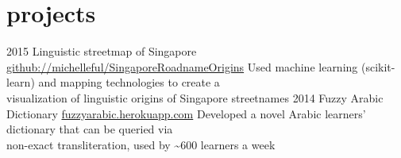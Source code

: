 \documentclass[]{friggeri-cv}
\begin{document}
\section{projects}

\begin{entrylist}
  \entry
    {2015}
    {Linguistic streetmap of Singapore}
    {\href{https://github.com/michelleful/SingaporeRoadnameOrigins}{github://michelleful/SingaporeRoadnameOrigins}}
    {\Squaredot Used machine learning (scikit-learn) and mapping technologies to create a \\
     \hspace*{3pt} visualization of linguistic origins of Singapore streetnames
    }
  \entry
    {2014}
    {Fuzzy Arabic Dictionary}
    {\href{http://fuzzyarabic.herokuapp.com}{fuzzyarabic.herokuapp.com}}
    {
    \Squaredot Developed a novel Arabic learners' dictionary that can be queried via \\
    \hspace*{3pt} non-exact transliteration, used by \textasciitilde 600 learners a week}
\end{entrylist}
\end{document}
